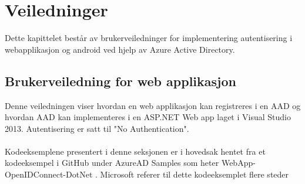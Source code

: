\chapter{Veiledninger}
\label{chap:veiledninger}
Dette kapittelet består av brukerveiledninger for implementering autentisering i webapplikasjon og android ved hjelp av Azure Active Directory.

\section{Brukerveiledning for web applikasjon}
\label{sec:veiledninger_brukerveiledningForWebApplikasjon}
Denne veiledningen viser hvordan en web applikasjon kan registreres i en AAD og hvordan AAD kan implementeres i en ASP.NET Web app laget i Visual Studio 2013. Autentisering er satt til "No Authentication".
\\
\\
Kodeeksemplene presentert i denne seksjonen er i hovedsak hentet fra et kodeeksempel i GitHub under AzureAD Samples som heter WebApp-OpenIDConnect-DotNet \cite{WebAppOpenIDConnectDotNet}. Microsoft referer til dette kodeeksemplet flere steder

